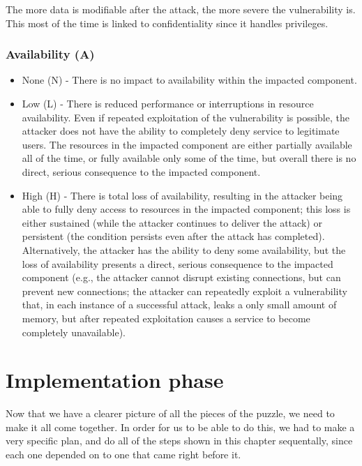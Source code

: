 The more data is modifiable after the attack, the more severe the vulnerability is. This most of the time is linked to confidentiality since it handles privileges.

\subsubsection{Availability (A)}

\begin{itemize}
	\item None (N) - There is no impact to availability within the impacted component.
	\item Low (L) - There is reduced performance or interruptions in resource availability. Even if repeated exploitation of the vulnerability is possible, the attacker does not have the ability to completely deny service to legitimate users. The resources in the impacted component are either partially available all of the time, or fully available only some of the time, but overall there is no direct, serious consequence to the impacted component.
	\item High (H) - There is total loss of availability, resulting in the attacker being able to fully deny access to resources in the impacted component; this loss is either sustained (while the attacker continues to deliver the attack) or persistent (the condition persists even after the attack has completed). Alternatively, the attacker has the ability to deny some availability, but the loss of availability presents a direct, serious consequence to the impacted component (e.g., the attacker cannot disrupt existing connections, but can prevent new connections; the attacker can repeatedly exploit a vulnerability that, in each instance of a successful attack, leaks a only small amount of memory, but after repeated exploitation causes a service to become completely unavailable).
\end{itemize}

\section{Implementation phase}

Now that we have a clearer picture of all the pieces of the puzzle, we need to make it all come together. In order for us to be able to do this, we had to make a very specific plan, and do all of the steps shown in this chapter sequentally, since each one depended on to one that came right before it.

